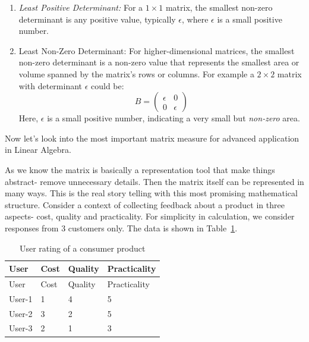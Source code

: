 \documentclass[
  letterpaper,
  DIV=11,
  numbers=noendperiod]{scrreprt}
\providecommand{\tightlist}{%
  \setlength{\itemsep}{0pt}\setlength{\parskip}{0pt}}\usepackage{longtable,booktabs,array}
\theoremstyle{plain}
\theoremstyle{definition}
\theoremstyle{remark}
\begin{document}
\begin{tcolorbox}[enhanced jigsaw, leftrule=.75mm, bottomtitle=1mm, colback=white, toptitle=1mm, opacitybacktitle=0.6, toprule=.15mm, colbacktitle=quarto-callout-important-color!10!white, arc=.35mm, colframe=quarto-callout-important-color-frame, title=\textcolor{quarto-callout-important-color}{\faExclamation}\hspace{0.5em}{Least Possible Values of Determinant}, titlerule=0mm, rightrule=.15mm, left=2mm, bottomrule=.15mm, breakable, coltitle=black, opacityback=0]

\begin{enumerate}
\def\labelenumi{\arabic{enumi}.}
\tightlist
\item
  \emph{Least Positive Determinant:} For a \(1\times 1\) matrix, the
  smallest non-zero determinant is any positive value, typically
  \(\epsilon\), where \(\epsilon\) is a small positive number.
\item
  Least Non-Zero Determinant: For higher-dimensional matrices, the
  smallest non-zero determinant is a non-zero value that represents the
  smallest area or volume spanned by the matrix's rows or columns. For
  example a \(2\times 2\) matrix with determinant \(\epsilon\) could be:
  \[B=\begin{pmatrix}\epsilon&0\\ 0&\epsilon\end{pmatrix}\] Here,
  \(\epsilon\) is a small positive number, indicating a very small but
  \emph{non-zero} area.
\end{enumerate}

\end{tcolorbox}

Now let's look into the most important matrix measure for advanced
application in Linear Algebra.

As we know the matrix is basically a representation tool that make
things abstract- remove unnecessary details. Then the matrix itself can
be represented in many ways. This is the real story telling with this
most promising mathematical structure. Consider a context of collecting
feedback about a product in three aspects- cost, quality and
practicality. For simplicity in calculation, we consider responses from
3 customers only. The data is shown in Table~\ref{tbl-RT}.

\begin{longtable}[]{@{}llll@{}}
\caption{User rating of a consumer product}\label{tbl-RT}\tabularnewline
\toprule\noalign{}
User & Cost & Quality & Practicality \\
\midrule\noalign{}
\endfirsthead
\toprule\noalign{}
User & Cost & Quality & Practicality \\
\midrule\noalign{}
\endhead
\bottomrule\noalign{}
\endlastfoot
User-1 & 1 & 4 & 5 \\
User-2 & 3 & 2 & 5 \\
User-3 & 2 & 1 & 3 \\
\end{longtable}
\end{document}
